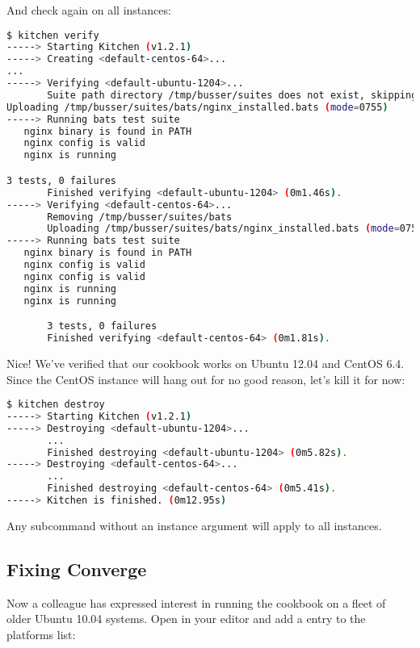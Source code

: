 And check again on all instances:

\begin{lstlisting}[language=Bash,label=lst:testing-test-kitchen24]
$ kitchen verify
-----> Starting Kitchen (v1.2.1)
-----> Creating <default-centos-64>...
...
-----> Verifying <default-ubuntu-1204>...
       Suite path directory /tmp/busser/suites does not exist, skipping.
Uploading /tmp/busser/suites/bats/nginx_installed.bats (mode=0755)
-----> Running bats test suite
   nginx binary is found in PATH
   nginx config is valid
   nginx is running

3 tests, 0 failures
       Finished verifying <default-ubuntu-1204> (0m1.46s).
-----> Verifying <default-centos-64>...
       Removing /tmp/busser/suites/bats
       Uploading /tmp/busser/suites/bats/nginx_installed.bats (mode=0755)
-----> Running bats test suite
   nginx binary is found in PATH
   nginx config is valid                                                    2/3
   nginx config is valid
   nginx is running                                                         3/3
   nginx is running

       3 tests, 0 failures
       Finished verifying <default-centos-64> (0m1.81s).
\end{lstlisting}

Nice! We've verified that our cookbook works on Ubuntu 12.04 and CentOS 6.4. Since the CentOS instance will hang out for no good reason, let's kill it for now:

\begin{lstlisting}[language=Bash,label=lst:testing-test-kitchen25]
$ kitchen destroy
-----> Starting Kitchen (v1.2.1)
-----> Destroying <default-ubuntu-1204>...
       ...
       Finished destroying <default-ubuntu-1204> (0m5.82s).
-----> Destroying <default-centos-64>...
       ...
       Finished destroying <default-centos-64> (0m5.41s).
-----> Kitchen is finished. (0m12.95s)
\end{lstlisting}

Any  subcommand without an instance argument will apply to all instances.



\subsection{Fixing Converge}

Now a colleague has expressed interest in running the cookbook on a fleet of older Ubuntu 10.04 systems. Open  in your editor and add a  entry to the platforms list:

